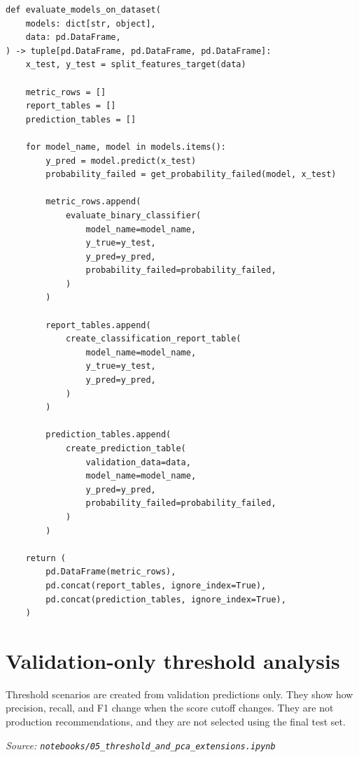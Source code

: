 \documentclass[10pt]{article}
\begin{document}
\begin{lstlisting}
def evaluate_models_on_dataset(
    models: dict[str, object],
    data: pd.DataFrame,
) -> tuple[pd.DataFrame, pd.DataFrame, pd.DataFrame]:
    x_test, y_test = split_features_target(data)

    metric_rows = []
    report_tables = []
    prediction_tables = []

    for model_name, model in models.items():
        y_pred = model.predict(x_test)
        probability_failed = get_probability_failed(model, x_test)

        metric_rows.append(
            evaluate_binary_classifier(
                model_name=model_name,
                y_true=y_test,
                y_pred=y_pred,
                probability_failed=probability_failed,
            )
        )

        report_tables.append(
            create_classification_report_table(
                model_name=model_name,
                y_true=y_test,
                y_pred=y_pred,
            )
        )

        prediction_tables.append(
            create_prediction_table(
                validation_data=data,
                model_name=model_name,
                y_pred=y_pred,
                probability_failed=probability_failed,
            )
        )

    return (
        pd.DataFrame(metric_rows),
        pd.concat(report_tables, ignore_index=True),
        pd.concat(prediction_tables, ignore_index=True),
    )
\end{lstlisting}

\section{Validation-only threshold analysis}

Threshold scenarios are created from validation predictions only. They show how
precision, recall, and F1 change when the score cutoff changes. They are not
production recommendations, and they are not selected using the final test set.

\textit{Source: \texttt{notebooks/05\_threshold\_and\_pca\_extensions.ipynb}}
\end{document}
